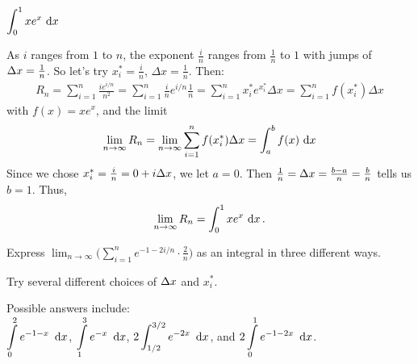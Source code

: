 \begin{answer}
$\displaystyle\int_0^1 x e^{x}\,\,\mathrm{d}x$
\end{answer}

\begin{solution}
As $i$ ranges from $1$ to $n$, the exponent $\frac{i}{n}$ ranges from $\frac{1}{n}$ to $1$ with
jumps of $\Delta x=\frac{1}{n}$. So let's try $x_i^* =\frac{ i}{n}$, $\Delta x=\frac{1}{n}$. Then:
\begin{align*}
R_n= \sum_{i=1}^{n} \frac{i e^{i/n}}{n^2}
= \sum_{i=1}^{n} \frac{i}{n} e^{i/n} \frac{1}{n}
= \sum_{i=1}^{n} x_i^* e^{x_i^*} \Delta x
= \sum_{i=1}^{n} f(x_i^*) \Delta x
\end{align*}
with $f(x)= x e^x$, and the limit
\begin{align*}
\lim_{n\to\infty} R_n
=\lim_{n\to\infty} \sum_{i=1}^{n} f(x_i^*)\Delta  x
=\int_a^b f(x)\,\,\mathrm{d}x
\end{align*}
Since we chose $x_i^* = \frac{i}{n} = 0+i\Delta x$, we let $a=0$. Then $\frac{1}{n}=\Delta x = \frac{b-a}{n}=\frac{b}{n}$ tells us $b=1$. Thus,
\begin{align*}
\lim_{n\to\infty}R_n
=\int_0^1 xe^{x}\,\,\mathrm{d}x\,.
\end{align*}

\end{solution}


\begin{Mquestion}[2016A]
Express
$\displaystyle\lim_{n\rightarrow\infty} \bigg( \sum_{i=1}^n e^{-1-2i/n}\cdot \frac{2}{n} \bigg)$
as an integral in three different ways.
\end{Mquestion}

\begin{hint}
Try several different choices of $\Delta x$ and $x_i^*$.
\end{hint}

\begin{answer}
Possible answers include:\\[5pt] $\displaystyle\int\limits_0^2 e^{-1-x}\ \,\dee{x}$,\quad
                                $\displaystyle\int\limits_1^3 e^{-x}\ \,\dee{x}$, \quad
                                $2\displaystyle\int_{1/2}^{3/2} e^{-2x}\ \,\dee{x}$, \quad
and \quad
                                $2\displaystyle\int\limits_0^1 e^{-1-2x}\ \,\dee{x}$.
\end{answer}

